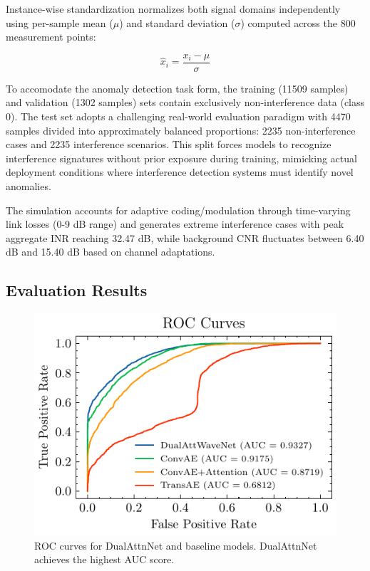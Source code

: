 \documentclass[12pt]{article}
\begin{document}
Instance-wise standardization normalizes both signal domains independently using per-sample mean (\( \mu \)) and standard deviation (\( \sigma \)) computed across the 800 measurement points:

\begin{equation}
    \hat{x}_i = \frac{x_i - \mu}{\sigma}
\end{equation}

To accomodate the anomaly detection task form, the training (11509 samples) and validation (1302 samples) sets contain exclusively non-interference data (class 0). The test set adopts a challenging real-world evaluation paradigm with 4470 samples divided into approximately balanced proportions: 2235 non-interference cases and 2235 interference scenarios. This split forces models to recognize interference signatures without prior exposure during training, mimicking actual deployment conditions where interference detection systems must identify novel anomalies.

The simulation accounts for adaptive coding/modulation through time-varying link losses (0-9 dB range) and generates extreme interference cases with peak aggregate INR reaching 32.47 dB, while background CNR fluctuates between 6.40 dB and 15.40 dB based on channel adaptations.

\subsection{Evaluation Results}

\begin{figure}[htbp]
    \centering
    \includegraphics[width=0.5\linewidth]{roc-comparison.pdf} 
    \caption{ROC curves for DualAttnNet and baseline models. DualAttnNet achieves the highest AUC score.}
    \label{fig:roc_comparison}
\end{figure}
\end{document}
